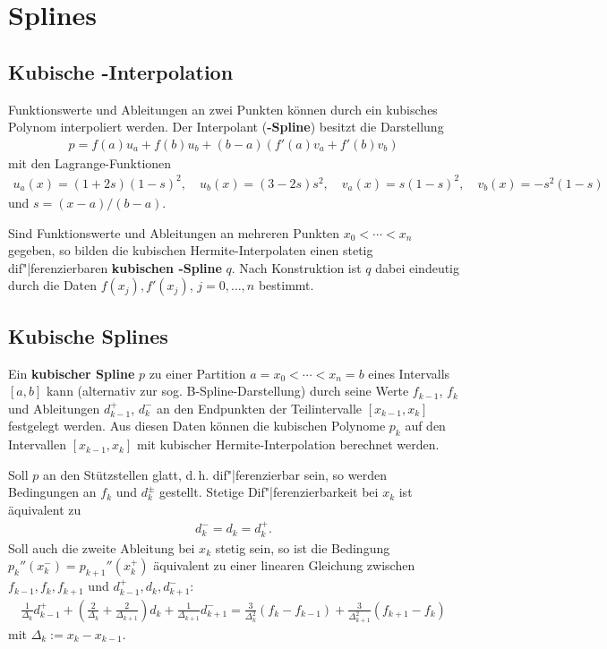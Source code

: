 \pagebreak

\section{%
    Splines%
}

\subsection{%
    Kubische -Interpolation%
}

Funktionswerte und Ableitungen an zwei Punkten können durch ein kubisches
Polynom interpoliert werden.
Der Interpolant (\textbf{-Spline}) besitzt die Darstellung
\begin{align*}
    p = f(a) u_a + f(b) u_b + (b - a)(f'(a) v_a + f'(b) v_b)
\end{align*}
mit den Lagrange-Funktionen
\begin{align*}
    u_a(x) = (1 + 2s)(1 - s)^2, \quad
    u_b(x) = (3 - 2s)s^2, \quad
    v_a(x) = s(1 - s)^2, \quad
    v_b(x) = -s^2 (1 - s)
\end{align*}
und $s = (x - a) / (b - a)$.

Sind Funktionswerte und Ableitungen an mehreren Punkten $x_0 < \dotsb < x_n$
gegeben, so bilden die kubischen Hermite-Interpolaten einen stetig
dif"|ferenzierbaren \textbf{kubischen -Spline} $q$.
Nach Konstruktion ist $q$ dabei eindeutig durch die Daten $f(x_j), f'(x_j)$,
$j = 0, \dotsc, n$ bestimmt.

\subsection{%
    Kubische Splines%
}

Ein \textbf{kubischer Spline} $p$ zu einer Partition
$a = x_0 < \dotsb < x_n = b$ eines Intervalls $[a, b]$ kann
(alternativ zur sog. B-Spline-Darstellung) durch seine Werte $f_{k-1}$, $f_k$
und Ableitungen $d_{k-1}^+$, $d_k^-$ an den Endpunkten der Teilintervalle
$[x_{k-1}, x_k]$ festgelegt werden.
Aus diesen Daten können die kubischen Polynome $p_k$ auf den Intervallen
$[x_{k-1}, x_k]$ mit kubischer Hermite-Interpolation berechnet werden.

Soll $p$ an den Stützstellen glatt, d.\,h. dif"|ferenzierbar sein, so
werden Bedingungen an $f_k$ und $d_k^\pm$ gestellt.
Stetige Dif"|ferenzierbarkeit bei $x_k$ ist äquivalent zu
\begin{align*}
    d_k^{-} = d_k = d_k^{+}.
\end{align*}
Soll auch die zweite Ableitung bei $x_k$ stetig sein, so ist die Bedingung
$p_k''(x_k^-) = p_{k+1}''(x_k^+)$ äquivalent zu einer linearen Gleichung
zwischen $f_{k-1}, f_k, f_{k+1}$ und $d_{k-1}^+, d_k, d_{k+1}^-$:
\begin{align*}
    \frac{1}{\Delta_k} d_{k-1}^+ +
    \left(\frac{2}{\Delta_k} + \frac{2}{\Delta_{k+1}}\right) d_k +
    \frac{1}{\Delta_{k+1}} d_{k+1}^- =
    \frac{3}{\Delta_k^2} (f_k - f_{k-1}) +
    \frac{3}{\Delta_{k+1}^2} (f_{k+1} - f_k)
\end{align*}
mit $\Delta_k := x_k - x_{k-1}$.

